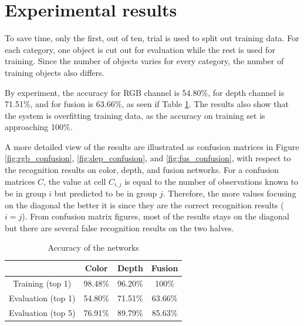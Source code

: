 \section{Experimental results}\label{sec:experiments}
To save time, only the first, out of ten, trial is used to split out training data. For each category, one object is cut out for evaluation while the rest is used for training. Since the number of objects varies for every category, the number of training objects also differs.

By experiment, the accuracy for RGB channel is 54.80\%, for depth channel is 71.51\%, and for fusion is 63.66\%, as seen if Table \ref{tab:accuracy}. The results also show that the system is overfitting training data, as the accuracy on training set is approaching 100\%. 

A more detailed view of the results are illustrated as confusion matrices in Figure \ref{fig:rgb_confusion}, \ref{fig:dep_confusion}, and \ref{fig:fus_confusion}, with respect to the recognition results on color, depth, and fusion networks. For a confusion matrices $C$, the value at cell $C_{i,j}$ is equal to the number of observations known to be in group $i$ but predicted to be in group $j$. Therefore, the more values focusing on the diagonal the better it is since they are the correct recognition results ($i=j$). From confusion matrix figures, most of the results stays on the diagonal but there are several false recognition results on the two halves.

\begin{table}
	\centering
	\caption{Accuracy of the networks}
	\begin{tabular}{|c|c|c|c|}
		\hline 
		& Color & Depth & Fusion \\ 
		\hline 
		Training (top 1) & 98.48\% & 96.20\% & 100\% \\ 
		Evaluation (top 1) & 54.80\% & 71.51\% & 63.66\% \\ 
		Evaluation (top 5) & 76.91\% & 89.79\% & 85.63\% \\ 
		\hline 
	\end{tabular}
	\label{tab:accuracy} 
\end{table}


